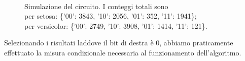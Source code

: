 \begin{figure}[h]
    \myfloatalign
     \\
    \caption{Simulazione del circuito. I conteggi totali sono\\
    per setosa: \{'00': 3843, '10': 2056, '01': 352, '11': 1941\}; \\
    per versicolor: \{'00': 2749, '10': 3908, '01': 1414, '11': 121\}.}
    \label{fig:simulazione_circuito}
\end{figure}

Selezionando i risultati laddove il bit di destra è 0, abbiamo praticamente effettuato 
la misura condizionale necessaria al funzionamento dell'algoritmo. 

